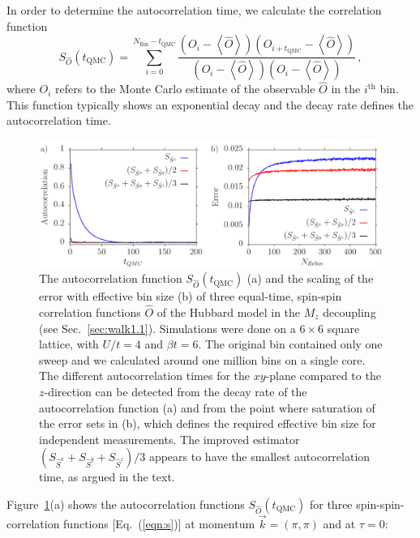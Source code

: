 In order to determine the autocorrelation time, we calculate the correlation function
\begin{equation}
\label{eqn:autocorrel}
	S_{\hat{O}}(t_{\textrm{QMC}})=\sum_{i=0}^{N_{\textrm{Bin}}-t_{\textrm{QMC}}}\frac{\left(O_i-\left\langle \hat{O}\right\rangle \right)\left(O_{i+t_{\textrm{QMC}}}-\left\langle \hat{O}\right\rangle \right)}{\left(O_i-\left\langle \hat{O}\right\rangle \right)\left(O_{i}-\left\langle \hat{O}\right\rangle \right)}\, ,
\end{equation}
where $O_i$ refers to the Monte Carlo estimate of the observable $\hat{O}$ in the $i^{\text{th}}$ bin. This function typically shows an exponential decay and the decay rate defines the autocorrelation time.
%
\begin{figure}
\includegraphics[width=1.0\textwidth]{Figures/fig1.pdf}
	\caption{The autocorrelation function $S_{\hat{O}}(t_{\textrm{QMC}})$ (a) and the scaling of the error with effective bin size (b) of three equal-time, spin-spin correlation functions $\hat{O}$ of the Hubbard model in the $M_z$ decoupling (see Sec.~\ref{sec:walk1.1}). Simulations were done on a $ 6 \times 6$ square lattice, with  $U/t=4$ and $\beta t = 6$.  The original bin contained only one sweep and we calculated around one million bins on a single core. The different  autocorrelation times for the $xy$-plane compared to the $z$-direction can be detected from the decay rate of the autocorrelation function (a) and from the point where saturation of the error sets in (b), which defines the required effective bin size for independent measurements. The improved estimator $(S_{\hat{S}^{x}} + S_{\hat{S}^{y}}+ S_{\hat{S}^{z}})/3$ appears to have the smallest autocorrelation time, as argued in the text.}
	\label{fig_autocorr}
\end{figure}
%
Figure~\ref{fig_autocorr}(a) shows the autocorrelation functions $S_{\hat{O}}(t_{\textrm{QMC}})$ for three spin-spin-correlation functions [Eq.~(\ref{eqn:s})] at momentum $\vec{k}=(\pi,\pi)$ and at $\tau=0$: 

